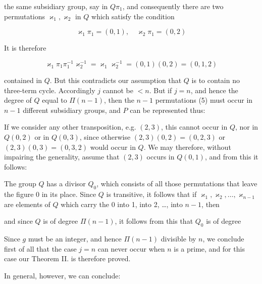 the same subsidiary group, say in $Q\pi_1$, and consequently there are two
permutations $\varkappa_1, \varkappa_2$ in $Q$ which satisfy the condition

\[ \varkappa_1 \pi_1 = (0, 1), \quad \varkappa_2 \pi_1 = (0, 2) \]

It is therefore

\[ \varkappa_1 \pi_1 \pi_1^{-1} \varkappa_2^{-1} = \varkappa_1 \varkappa_2^{-1} = (0,1)(0,2) = (0,1,2) \]

contained in $Q$. But this contradicts our assumption that $Q$ is to contain no
three-term cycle. Accordingly $j$ cannot be $< n$. But if $j = n$, and hence the
degree of $Q$ equal to $\Pi(n-1)$, then the $n-1$ permutations (5) must occur in
$n-1$ different subsidiary groups, and $P$ can be represented thus:


If we consider any other transposition, e.g. $(2,3)$, this cannot occur
in $Q$, nor in $Q(0,2)$ or in $Q(0,3)$, since otherwise
$(2,3)(0,2) = (0,2,3)$ or $(2,3)(0,3) = (0,3,2)$ would occur in $Q$. We may therefore,
without impairing the generality, assume that $(2,3)$ occurs in $Q(0,1)$,
and from this it follows:



The group $Q$ has a divisor $Q_0$, which consists of all those permutations
that leave the figure 0 in its place. Since $Q$ is transitive, it follows that if
$\varkappa_1, \varkappa_2, \ldots, \varkappa_{n-1}$ are elements of $Q$ which carry the 0
into 1, into 2, \ldots, into $n-1$, then


and since $Q$ is of degree $\Pi(n-1)$, it follows from this that $Q_0$ is of degree


Since $g$ must be an integer, and hence $\Pi(n-1)$ divisible by $n$, we
conclude first of all that the case $j = n$ can never occur when $n$
is a prime, and for this case our Theorem II. is therefore proved.

In general, however, we can conclude:

